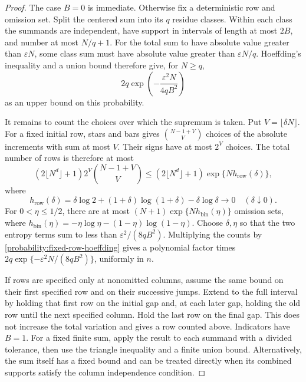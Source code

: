 \begin{proof}
The case $B=0$ is immediate.  Otherwise fix a deterministic row
and omission set.  Split the centered sum into its $q$ residue
classes.  Within each class the summands are independent, have
support in intervals of length at most $2B$, and number at most
$N/q+1$.  For the total sum to have absolute value greater than
$\varepsilon N$, some class sum must have absolute value greater
than $\varepsilon N/q$.  Hoeffding's inequality
\cite[Theorem~2, Equation~(2.6)]{Hoeffding1963} and a union bound
therefore give, for $N\ge q$,
\begin{equation}
            2q\exp\left(-\frac{\varepsilon^2N}{4qB^2}\right)
 \label{probability:fixed-row-hoeffding}
\end{equation}
as an upper bound on this probability.

It remains to count the choices over which the supremum is taken.
Put $V=\lfloor\delta N\rfloor$.  For a fixed initial row, stars
and bars gives $\binom{N-1+V}{V}$ choices of the absolute
increments with sum at most $V$.  Their signs have at most $2^V$
choices.  The total number of rows is therefore at most
\[
 (2\lfloor N^d\rfloor+1)2^V\binom{N-1+V}{V}
 \le (2\lfloor N^d\rfloor+1)
                 \exp\{Nh_{\mathrm{row}}(\delta)\},
\]
where
\[
 h_{\mathrm{row}}(\delta)
   =\delta\log2+(1+\delta)\log(1+\delta)-\delta\log\delta
       \longrightarrow0\quad(\delta\downarrow0).
\]
For $0<\eta\le1/2$, there are at most
$(N+1)\exp\{Nh_{\mathrm{bin}}(\eta)\}$ omission sets, where
$h_{\mathrm{bin}}(\eta)=-\eta\log\eta-(1-\eta)\log(1-\eta)$.
Choose $\delta,\eta$ so that the two entropy terms sum to less
than $\varepsilon^2/(8qB^2)$.  Multiplying the counts by
\eqref{probability:fixed-row-hoeffding} gives a polynomial factor
times $2q\exp\{-\varepsilon^2N/(8qB^2)\}$, uniformly in $n$.

If rows are specified only at nonomitted columns, assume the same
bound on their first specified row and on their successive jumps.
Extend to the full interval by holding that first row on the
initial gap and, at each later gap, holding the old row until the
next specified column.  Hold the last row on the final gap.  This
does not increase the total variation and gives a row counted
above.  Indicators have $B=1$.  For a fixed finite sum, apply the
result to each summand with a divided tolerance, then use the
triangle inequality and a finite union bound.  Alternatively, the
sum itself has a fixed bound and can be treated directly when its
combined supports satisfy the column independence condition.
\end{proof}

